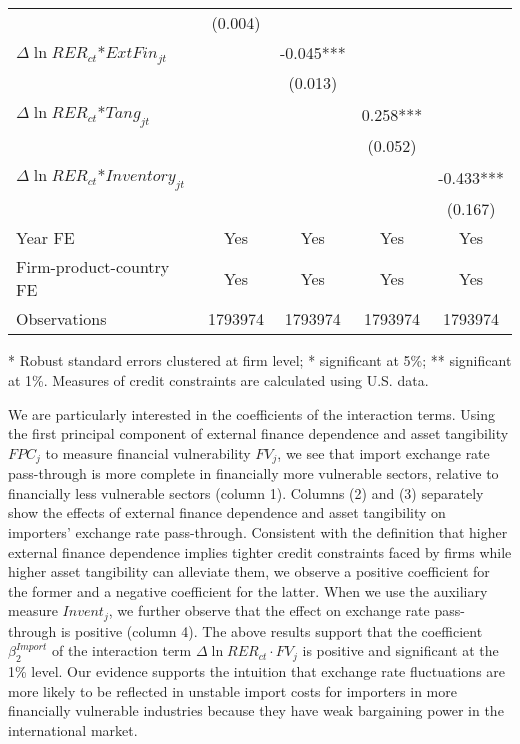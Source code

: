 \begin{table}[htbp]
\begin{threeparttable}
\begin{tabular}{lcccc}
		& (0.004) &       &       &  \\
		$\Delta \ln RER_{ct}$*$ExtFin_{jt}$ &       & -0.045*** &       &  \\
		&       & (0.013) &       &  \\
		$\Delta \ln RER_{ct}$*$Tang_{jt}$ &       &       & 0.258*** &  \\
		&       &       & (0.052) &  \\
		$\Delta \ln RER_{ct}$*$Inventory_{jt}$ &       &       &       & -0.433*** \\
		&       &       &       & (0.167) \\
		Year FE  & Yes   & Yes   & Yes   & Yes \\
		Firm-product-country FE & Yes   & Yes   & Yes   & Yes \\
		Observations & 1793974 & 1793974 & 1793974 & 1793974 \\
		\bottomrule
	\end{tabular}
	\label{tab5.2}
	\begin{tablenotes}
		\footnotesize
		\item[*] Robust standard errors clustered at firm level; * significant at 5\%; ** significant at 1\%. Measures of credit constraints are calculated using U.S. data.
	\end{tablenotes}
	\end{threeparttable}
\end{table}

We are particularly interested in the coefficients of the interaction terms. Using the first principal component of external finance dependence and asset tangibility $FPC_j$ to measure financial vulnerability $FV_j$, we see that import exchange rate pass-through is more complete in financially more vulnerable sectors, relative to financially less vulnerable sectors (column 1). Columns (2) and (3) separately show the effects of external finance dependence and asset tangibility on importers' exchange rate pass-through. Consistent with the definition that higher external finance dependence implies tighter credit constraints faced by firms while higher asset tangibility can alleviate them, we observe a positive coefficient for the former and a negative coefficient for the latter. When we use the auxiliary measure $Invent_j$, we further observe that the effect on exchange rate pass-through is positive (column 4). The above results support that the coefficient $\beta^{Import}_2$ of the interaction term $\Delta \ln RER_{ct} \cdot FV_{j}$ is positive and significant at the 1\% level. Our evidence supports the intuition that exchange rate fluctuations are more likely to be reflected in unstable import costs for importers in more financially vulnerable industries because they have weak bargaining power in the international market.

